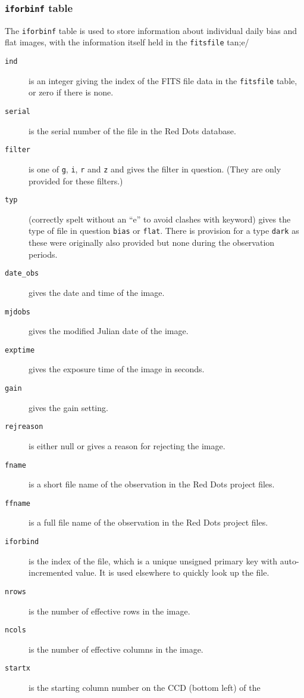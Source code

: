 \subsubsection{\texttt{iforbinf} table}
\protect\label{section:iforbinf}

The \texttt{iforbinf} table is used to store information about individual daily
bias and flat images, with the information itself held in the \texttt{fitsfile}
tan;e/

\begin{description}
\item[\tt ind] is an integer giving the index of the FITS file data in the
\texttt{fitsfile} table, or zero if there is none.
\item[\tt serial] is the serial number of the file in the Red Dots database.
\item[\tt filter] is one of \texttt{g}, \texttt{i}, \texttt{r} and \texttt{z}
and gives the filter in question. (They are only provided for these filters.)
\item[\tt typ] (correctly spelt without an ``e'' to avoid clashes with {\mysql}
keyword) gives the type of file in question \texttt{bias} or \texttt{flat}.
There is provision for a type \texttt{dark} as these were originally also
provided but none during the observation periods.
\item[\tt date\_obs] gives the date and time of the image.
\item[\tt mjdobs] gives the modified Julian date of the image.
\item[\tt exptime] gives the exposure time of the image in seconds.
\item[\tt gain] gives the gain setting.
\item[\tt rejreason] is either null or gives a reason for rejecting the image.
\item[\tt fname] is a short file name of the observation in the Red Dots
project files.
\item[\tt ffname] is a full file name of the observation in the Red Dots project
files.
\item[\tt iforbind] is the index of the file, which is a unique unsigned
primary key with auto-incremented value. It is used elsewhere to quickly look up
the file.
\item[\tt nrows] is the number of effective rows in the image.
\item[\tt ncols] is the number of effective columns in the image.
\item[\tt startx] is the starting column number on the CCD (bottom left) of the

\end{description}
